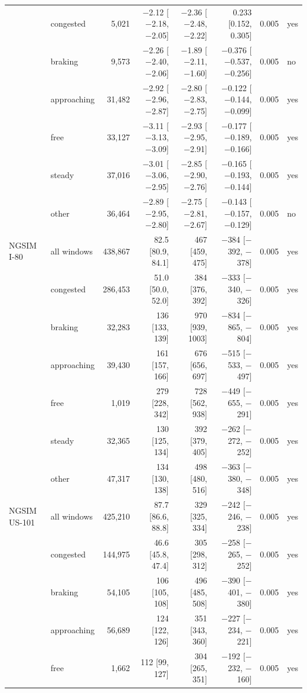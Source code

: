 \begin{longtable}{llrrrrrl}
 & congested & 5,021 & $-$2.12 [$-$2.18, $-$2.05] & $-$2.36 [$-$2.48, $-$2.22] & 0.233 [0.152, 0.305] & 0.005 & yes \\
 & braking & 9,573 & $-$2.26 [$-$2.40, $-$2.06] & $-$1.89 [$-$2.11, $-$1.60] & $-$0.376 [$-$0.537, $-$0.256] & 0.005 & no \\
 & approaching & 31,482 & $-$2.92 [$-$2.96, $-$2.87] & $-$2.80 [$-$2.83, $-$2.75] & $-$0.122 [$-$0.144, $-$0.099] & 0.005 & yes \\
 & free & 33,127 & $-$3.11 [$-$3.13, $-$3.09] & $-$2.93 [$-$2.95, $-$2.91] & $-$0.177 [$-$0.189, $-$0.166] & 0.005 & yes \\
 & steady & 37,016 & $-$3.01 [$-$3.06, $-$2.95] & $-$2.85 [$-$2.90, $-$2.76] & $-$0.165 [$-$0.193, $-$0.144] & 0.005 & yes \\
 & other & 36,464 & $-$2.89 [$-$2.95, $-$2.80] & $-$2.75 [$-$2.81, $-$2.67] & $-$0.143 [$-$0.157, $-$0.129] & 0.005 & no \\
\midrule
NGSIM I-80 & all windows & 438,867 & 82.5 [80.9, 84.1] & 467 [459, 475] & $-$384 [$-$392, $-$378] & 0.005 & yes \\
 & congested & 286,453 & 51.0 [50.0, 52.0] & 384 [376, 392] & $-$333 [$-$340, $-$326] & 0.005 & yes \\
 & braking & 32,283 & 136 [133, 139] & 970 [939, 1003] & $-$834 [$-$865, $-$804] & 0.005 & yes \\
 & approaching & 39,430 & 161 [157, 166] & 676 [656, 697] & $-$515 [$-$533, $-$497] & 0.005 & yes \\
 & free & 1,019 & 279 [228, 342] & 728 [562, 938] & $-$449 [$-$655, $-$291] & 0.005 & yes \\
 & steady & 32,365 & 130 [125, 134] & 392 [379, 405] & $-$262 [$-$272, $-$252] & 0.005 & yes \\
 & other & 47,317 & 134 [130, 138] & 498 [480, 516] & $-$363 [$-$380, $-$348] & 0.005 & yes \\
\midrule
NGSIM US-101 & all windows & 425,210 & 87.7 [86.6, 88.8] & 329 [325, 334] & $-$242 [$-$246, $-$238] & 0.005 & yes \\
 & congested & 144,975 & 46.6 [45.8, 47.4] & 305 [298, 312] & $-$258 [$-$265, $-$252] & 0.005 & yes \\
 & braking & 54,105 & 106 [105, 108] & 496 [485, 508] & $-$390 [$-$401, $-$380] & 0.005 & yes \\
 & approaching & 56,689 & 124 [122, 126] & 351 [343, 360] & $-$227 [$-$234, $-$221] & 0.005 & yes \\
 & free & 1,662 & 112 [99, 127] & 304 [265, 351] & $-$192 [$-$232, $-$160] & 0.005 & yes \\

\end{longtable}
